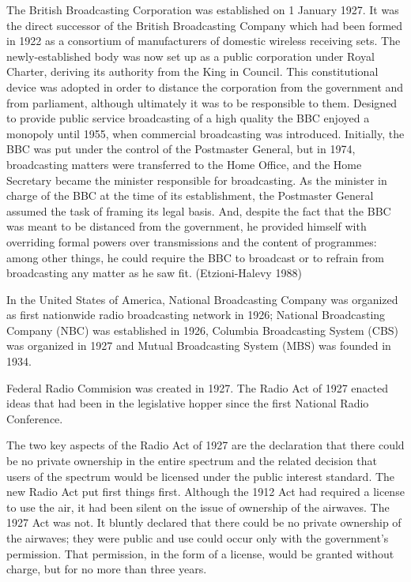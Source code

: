 \documentclass[a4paper,norsk,utf8]{report}
\begin{document}
    The British Broadcasting Corporation was established on 1 January 1927.
    It was the direct successor of the British Broadcasting Company which
    had been formed in 1922 as a consortium of manufacturers of domestic
    wireless receiving sets.  The newly-established body was now set up as a
    public corporation under Royal Charter, deriving its authority from the
    King in Council.   This constitutional device was adopted in order to distance
    the corporation from the government and from parliament, although ultimately
    it was to be responsible to them.   Designed to provide public service 
    broadcasting of a high quality the BBC enjoyed a monopoly until 1955,
    when commercial broadcasting was introduced.  Initially, the BBC was put
    under the control of the Postmaster General, but in 1974, broadcasting
    matters were transferred to the Home Office, and the Home Secretary became
    the minister responsible for broadcasting.   As the minister in charge of the
    BBC at the time of its establishment, the Postmaster General assumed the task
    of framing its legal basis.  And, despite the fact that the BBC was meant to be
    distanced from the government, he provided himself with overriding formal powers
    over transmissions and the content of programmes: among other things, he could
    require the BBC to broadcast or to refrain from broadcasting any matter as he saw
    fit. (Etzioni-Halevy 1988)

    In the United States of America, National Broadcasting Company was
    organized as first nationwide radio broadcasting network in 1926;
    National Broadcasting Company (NBC) was established in 1926,
    Columbia Broadcasting System (CBS) was organized in 1927 and
    Mutual Broadcasting System (MBS) was founded in 1934.

    Federal Radio Commision was created in 1927.   The Radio Act of 1927
    enacted ideas that had been in the legislative hopper since the first
    National Radio Conference.

    The two key aspects of the Radio Act of 1927 are the declaration
    that there could be no private ownership in the entire spectrum
    and the related decision that users of the spectrum would be
    licensed under the public interest standard.  The new Radio Act
    put first things first.  Although the 1912 Act had required a
    license to use the air, it had been silent on the issue of
    ownership of the airwaves.  The 1927 Act was not.  It bluntly
    declared that there could be no private ownership of the airwaves;
    they were public and use could occur only with the government's
    permission.  That permission, in the form of a license, would be
    granted without charge, but for no more than three years.
\end{document}
